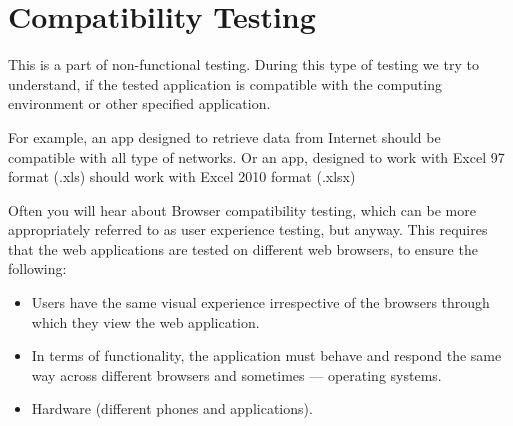 \section{Compatibility Testing}
\label{sec:Compatibility Testing}

This is a part of non-functional testing. During this type of testing we try to understand, if the tested application is compatible with the computing environment or other specified application.

For example, an app designed to retrieve data from Internet should be compatible with all type of networks. Or an app, designed to work with Excel 97 format (.xls) should work with Excel 2010 format (.xlsx)

Often you will hear about Browser compatibility testing, which can be more appropriately referred to as user experience testing, but anyway. This requires that the web applications are tested on different web browsers, to ensure the following:

\begin{itemize}
\item 
    Users have the same visual experience irrespective of the browsers through which they view the web application.
\item 
    In terms of functionality, the application must behave and respond the same way across different browsers and sometimes — operating systems.
\item 
    Hardware (different phones and applications).                                                 \end{itemize}
